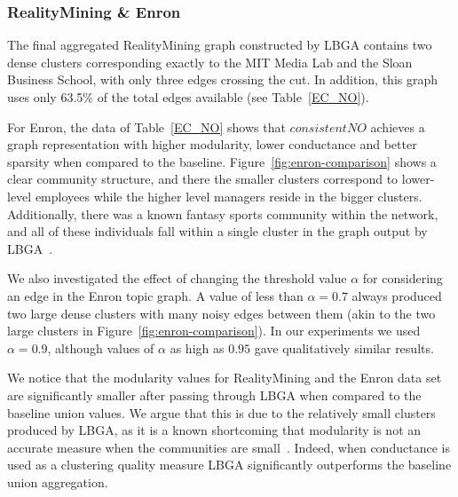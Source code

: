 \documentclass{IEEEtran}
\begin{document}
\subsubsection{RealityMining \& Enron} \label{sec:enron-results}
The final aggregated RealityMining graph constructed by LBGA contains two dense
clusters corresponding exactly to the MIT Media Lab and the Sloan Business
School, with only three edges crossing the cut. In addition, this graph uses
only 63.5\% of the total edges available (see Table~\ref{EC_NO}).

For Enron, the data of Table~\ref{EC_NO} shows that $consistentNO$ achieves a
graph representation with higher modularity, lower conductance and better
sparsity when compared to the baseline.  Figure~\ref{fig:enron-comparison}
shows a clear community structure, and there the smaller clusters correspond to
lower-level employees while the higher level managers reside in the bigger
clusters. Additionally, there was a known fantasy sports community within the
network, and all of these individuals fall within a single cluster in the graph
output by LBGA~\cite{Mccallum05}. 

We also investigated the effect of changing the threshold value $\alpha$ for
considering an edge in the Enron topic graph. A value of less than $\alpha =
0.7$ always produced two large dense clusters with many noisy edges between
them (akin to the two large clusters in Figure~\ref{fig:enron-comparison}). In
our experiments we used $\alpha = 0.9$, although values of $\alpha$ as high as
$0.95$ gave qualitatively similar results.

We notice that the modularity values for RealityMining and the Enron data set
are significantly smaller after passing through LBGA when compared to the
baseline union values. We argue that this is due to the relatively small
clusters produced by LBGA, as it is a known shortcoming that modularity is not
an accurate measure when the communities are small~\cite{Fortunato07}. Indeed,
when conductance is used as a clustering quality measure LBGA significantly
outperforms the baseline union aggregation.


\end{document}
